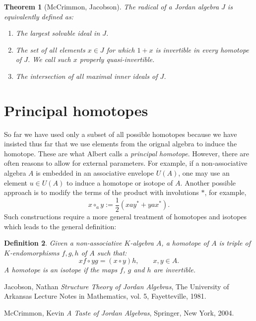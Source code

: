 \documentclass[12pt]{article}
\newtheorem{thm}{Theorem}
\newtheorem{defn}[thm]{Definition}
\begin{document}
\begin{thm}[McCrimmon, Jacobson]
The radical of a Jordan algebra $J$ is equivalently defined as:
\begin{enumerate}
\item The largest solvable ideal in $J$.
\item The set of all elements $x\in J$ for which $1+x$ is invertible in
every homotope of $J$.  We call such $x$ \emph{properly quasi-invertible}.
\item The intersection of all maximal inner ideals of $J$.
\end{enumerate}
\end{thm}

\section{Principal homotopes}

So far we have used only a subset of all possible homotopes because we have
insisted thus far that we use elements from the orignal algebra to induce the
homotope.  These are what Albert calls a \emph{principal homotope}.  However,
there are often reasons to allow for external parameters.  For example, if 
a non-associative algebra $A$ is embedded in an associative envelope $U(A)$,
one may use an element $u\in U(A)$ to induce a homotope or isotope of $A$.
Another possible approach is to modify the terms of the product with 
involutions $*$, for example,
\[x\circ_a y := \frac{1}{2}(xay^*+yax^*).\]
Such constructions require a more general treatment of homotopes and isotopes
which leads to the general definition:

\begin{defn}
Given a non-associative $K$-algebra $A$, a homotope of $A$ is triple of 
$K$-endomorphisms $f,g,h$ of $A$ such that:
\[xf\circ yg=(x\circ y)h,\qquad x,y\in A.\]
A homotope is an isotope if the maps $f$, $g$ and $h$ are invertible.
\end{defn}


\begin{thebibliography}{10}

Jacobson, Nathan \emph{Structure Theory of Jordan Algebras}, The University of
Arkansas Lecture Notes in Mathematics, vol. 5, Fayetteville, 1981.

McCrimmon, Kevin \emph{A Taste of Jordan Algebras}, Springer, New York, 2004.

\end{thebibliography}

\end{document}
